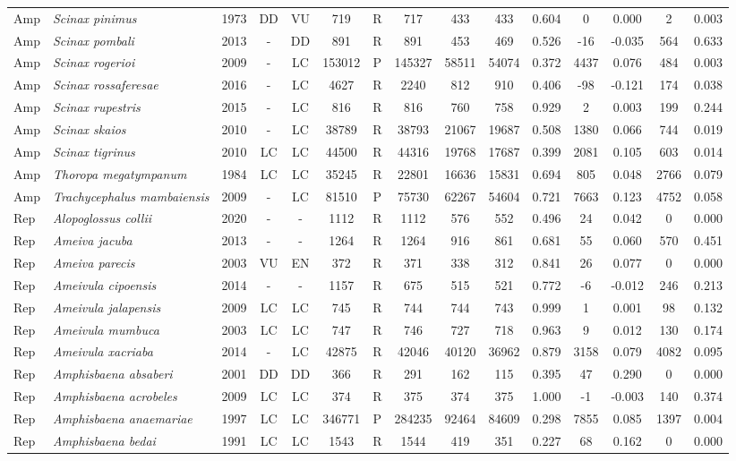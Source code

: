 \documentclass[12pt,openright,oneside,a4paper,english]{abntex2}
\begin{document}
\begin{landscape}
\begin{longtable}{llccccccccccccc}
		Amp&\textit{Scinax pinimus}&1973&DD&VU&719&R&717&433&433&0.604&0&0.000&2&0.003\\
		Amp&\textit{Scinax pombali}&2013&-&DD&891&R&891&453&469&0.526&-16&-0.035&564&0.633\\
		Amp&\textit{Scinax rogerioi}&2009&-&LC&153012&P&145327&58511&54074&0.372&4437&0.076&484&0.003\\
		Amp&\textit{Scinax rossaferesae}&2016&-&LC&4627&R&2240&812&910&0.406&-98&-0.121&174&0.038\\
		Amp&\textit{Scinax rupestris}&2015&-&LC&816&R&816&760&758&0.929&2&0.003&199&0.244\\
		Amp&\textit{Scinax skaios}&2010&-&LC&38789&R&38793&21067&19687&0.508&1380&0.066&744&0.019\\
		Amp&\textit{Scinax tigrinus}&2010&LC&LC&44500&R&44316&19768&17687&0.399&2081&0.105&603&0.014\\
		Amp&\textit{Thoropa megatympanum}&1984&LC&LC&35245&R&22801&16636&15831&0.694&805&0.048&2766&0.079\\
		Amp&\textit{Trachycephalus mambaiensis}&2009&-&LC&81510&P&75730&62267&54604&0.721&7663&0.123&4752&0.058\\
		Rep&\textit{Alopoglossus collii}&2020&-&-&1112&R&1112&576&552&0.496&24&0.042&0&0.000\\
		Rep&\textit{Ameiva jacuba}&2013&-&-&1264&R&1264&916&861&0.681&55&0.060&570&0.451\\
		Rep&\textit{Ameiva parecis}&2003&VU&EN&372&R&371&338&312&0.841&26&0.077&0&0.000\\
		Rep&\textit{Ameivula cipoensis}&2014&-&-&1157&R&675&515&521&0.772&-6&-0.012&246&0.213\\
		Rep&\textit{Ameivula jalapensis}&2009&LC&LC&745&R&744&744&743&0.999&1&0.001&98&0.132\\
		Rep&\textit{Ameivula mumbuca}&2003&LC&LC&747&R&746&727&718&0.963&9&0.012&130&0.174\\
		Rep&\textit{Ameivula xacriaba}&2014&-&LC&42875&R&42046&40120&36962&0.879&3158&0.079&4082&0.095\\
		Rep&\textit{Amphisbaena absaberi}&2001&DD&DD&366&R&291&162&115&0.395&47&0.290&0&0.000\\
		Rep&\textit{Amphisbaena acrobeles}&2009&LC&LC&374&R&375&374&375&1.000&-1&-0.003&140&0.374\\
		Rep&\textit{Amphisbaena anaemariae}&1997&LC&LC&346771&P&284235&92464&84609&0.298&7855&0.085&1397&0.004\\
		Rep&\textit{Amphisbaena bedai}&1991&LC&LC&1543&R&1544&419&351&0.227&68&0.162&0&0.000\\

\end{longtable}
\end{landscape}
\end{document}
